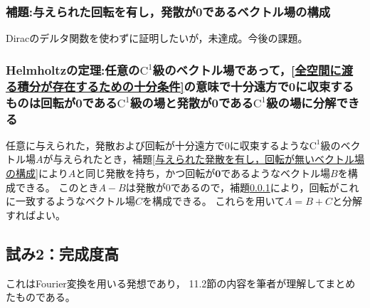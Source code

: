             \subsubsection{補題:与えられた回転を有し，発散が0であるベクトル場の構成}
                \label{与えられた回転を有し，発散が無いベクトル場の構成}
                Diracのデルタ関数を使わずに証明したいが，未達成。今後の課題。
            \subsubsection{Helmholtzの定理:任意の\texorpdfstring{$\mathrm{C}^1$}{C\string^1}級のベクトル場であって，\ref{全空間に渡る積分が存在するための十分条件}の意味で十分遠方で0に収束するものは回転が\texorpdfstring{$\bm{0}$}{0}である\texorpdfstring{$\mathrm{C}^1$}{C\string^1}級の場と発散が0である\texorpdfstring{$\mathrm{C}^1$}{C\string^1}級の場に分解できる}
                任意に与えられた，発散および回転が十分遠方で0に収束するような$\mathrm{C}^1$級のベクトル場$A$が与えられたとき，補題\ref{与えられた発散を有し，回転が無いベクトル場の構成}により$A$と同じ発散を持ち，かつ回転が$\bm{0}$であるようなベクトル場$B$を構成できる。
                このとき$A - B$は発散が0であるので，補題\ref{与えられた回転を有し，発散が無いベクトル場の構成}により，回転がこれに一致するようなベクトル場$C$を構成できる。
                これらを用いて$A = B + C$と分解すればよい。
        \subsection{試み2：完成度高}
            これはFourier変換を用いる発想であり，\cite{qm3_chap5_j} 11.2節の内容を筆者が理解してまとめたものである。

